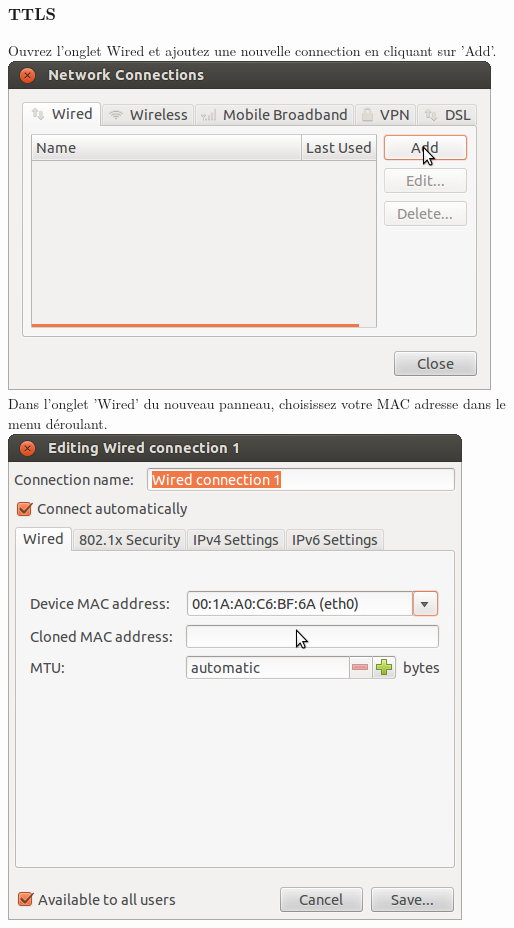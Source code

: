 \subsubsection{TTLS}
Ouvrez l'onglet Wired et ajoutez une nouvelle connection en cliquant sur 'Add'.\\
\includegraphics[width=\screenShotSize{}]{imgUser/wiredAdd.png}\\
Dans l'onglet 'Wired' du nouveau panneau, choisissez votre MAC adresse dans le menu déroulant.\\
\includegraphics[width=\screenShotSize{}]{imgUser/setMac.png}\\
